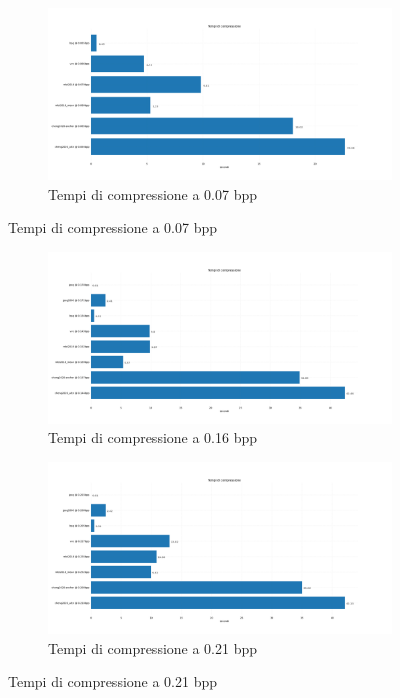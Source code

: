\begin{figure}[!h]
    \centering
    \begin{subfigure}[]{1\textwidth}
        \includegraphics[width=\textwidth]{Immagini/METRICS/times@0.07bpp.png}
        \caption{Tempi di compressione a 0.07 bpp}
        \label{fig:times07}
    \end{subfigure}
    \label{fig:CompressionTimes1}
\end{figure}
\begin{figure}[!h]
    \begin{subfigure}[]{1\textwidth}
        \includegraphics[width=\textwidth]{Immagini/METRICS/times@0.16bpp.png}
        \caption{Tempi di compressione a 0.16 bpp}
        \label{fig:times16}
    \end{subfigure}
    \hspace*{0.5cm}
    \begin{subfigure}[]{1\textwidth}
        \includegraphics[width=\textwidth]{Immagini/METRICS/times@0.21bpp.png}
        \caption{Tempi di compressione a 0.21 bpp}
        \label{fig:times21}
    \end{subfigure}
    \label{fig:CompressionTimes2}
\end{figure}
